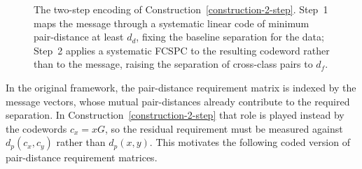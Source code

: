 \documentclass[11pt,draftclsnofoot,journal,onecolumn]{IEEEtran}
\newtheorem{definition}{Definition}
\begin{document}
    \begin{figure}[t]
    \centering
    \caption{The two-step encoding of Construction~\ref{construction-2-step}. Step~1
    maps the message through a systematic linear code of minimum pair-distance at least
    $d_d$, fixing the baseline separation for the data; Step~2 applies a systematic
    FCSPC to the resulting codeword rather than to the message, raising the separation
    of cross-class pairs to $d_f$.}
    \label{fig:two-step}
\end{figure}

    In the original framework, the pair-distance requirement matrix is indexed by the message vectors, whose mutual pair-distances already contribute to the required separation. In Construction~\ref{construction-2-step} that role is played instead by the codewords $c_x=xG$, so the residual requirement must be measured against $d_p(c_x,c_y)$ rather than $d_p(x,y)$. This motivates the following coded version of pair-distance requirement matrices.

\end{document}
